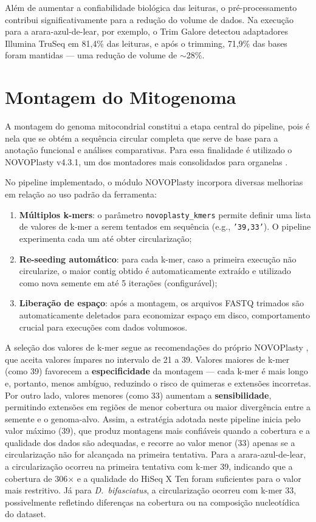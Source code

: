 Além de aumentar a confiabilidade biológica das leituras, o pré-processamento contribui significativamente para a redução do volume de dados. Na execução para a arara-azul-de-lear, por exemplo, o Trim Galore detectou adaptadores Illumina TruSeq em 81,4\% das leituras, e após o trimming, 71,9\% das bases foram mantidas --- uma redução de volume de $\sim$28\%.

\section{Montagem do Mitogenoma}

A montagem do genoma mitocondrial constitui a etapa central do pipeline, pois é nela que se obtém a sequência circular completa que serve de base para a anotação funcional e análises comparativas. Para essa finalidade é utilizado o NOVOPlasty v4.3.1, um dos montadores mais consolidados para organelas \cite{dierckxsens2017}.

No pipeline implementado, o módulo NOVOPlasty incorpora diversas melhorias em relação ao uso padrão da ferramenta:

\begin{enumerate}
    \item \textbf{Múltiplos k-mers}: o parâmetro \texttt{novoplasty\_kmers} permite definir uma lista de valores de k-mer a serem tentados em sequência (e.g., \texttt{'39,33'}). O pipeline experimenta cada um até obter circularização;
    \item \textbf{Re-seeding automático}: para cada k-mer, caso a primeira execução não circularize, o maior contig obtido é automaticamente extraído e utilizado como nova semente em até 5 iterações (configurável);
    \item \textbf{Liberação de espaço}: após a montagem, os arquivos FASTQ trimados são automaticamente deletados para economizar espaço em disco, comportamento crucial para execuções com dados volumosos.
\end{enumerate}

A seleção dos valores de k-mer segue as recomendações do próprio NOVOPlasty \cite{dierckxsens2017}, que aceita valores ímpares no intervalo de 21 a 39. Valores maiores de k-mer (como 39) favorecem a \textbf{especificidade} da montagem --- cada k-mer é mais longo e, portanto, menos ambíguo, reduzindo o risco de quimeras e extensões incorretas. Por outro lado, valores menores (como 33) aumentam a \textbf{sensibilidade}, permitindo extensões em regiões de menor cobertura ou maior divergência entre a semente e o genoma-alvo. Assim, a estratégia adotada neste pipeline inicia pelo valor máximo (39), que produz montagens mais confiáveis quando a cobertura e a qualidade dos dados são adequadas, e recorre ao valor menor (33) apenas se a circularização não for alcançada na primeira tentativa. Para a arara-azul-de-lear, a circularização ocorreu na primeira tentativa com k-mer 39, indicando que a cobertura de 306$\times$ e a qualidade do HiSeq X Ten foram suficientes para o valor mais restritivo. Já para \textit{D.~bifasciatus}, a circularização ocorreu com k-mer 33, possivelmente refletindo diferenças na cobertura ou na composição nucleotídica do dataset.

